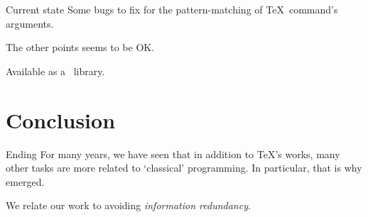 \documentclass[pdf]{beamer}
\begin{document}
\begin{frame}{Current state}
Some bugs to fix for the pattern-matching of \TeX\ command's arguments.\pause

The other points seems to be OK.\pause

Available as a \pgScheme\ library.
\end{frame}

\section{Conclusion}

\begin{frame}{Ending}
For many years, we have seen that in addition to \TeX's works, many other tasks
are more related to `classical' programming. In particular, that is why
 emerged.\pause

We relate our work to avoiding \emph{information redundancy}.
\end{frame}
\end{document}
